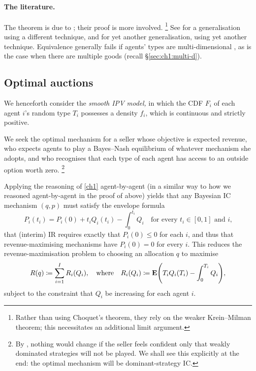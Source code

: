 \paragraph{The literature.}
The theorem is due to \textcite{ManelliVincent2010};
their proof is more involved.%
	\footnote{Rather than using Choquet's theorem, they rely on the weaker Krein--Milman theorem; this necessitates an additional limit argument.}
See \textcite{GershkovEtAl2013} for a generalisation using a different technique, and \textcite{KleinerMoldovanuStrack2021} for yet another generalisation, using yet another technique.
Equivalence generally fails if agents' types are multi-dimensional \parencite{JehielMoldovanuStacchetti1999}, as is the case when there are multiple goods (recall §\ref{sec:ch1:multi-d}).



\subsection{Optimal auctions}
\label{sec:ch2:optimal_auctions}

We henceforth consider the \emph{smooth IPV model,}
in which the CDF $F_i$ of each agent $i$'s random type $T_i$
possesses a density $f_i$, which is continuous and strictly positive.

We seek the optimal mechanism for a seller
whose objective is expected revenue,
who expects agents to play a Bayes--Nash equilibrium of whatever mechanism she adopts,
and who recognises that each type of each agent has access to an outside option worth zero.%
	\footnote{By , nothing would change if the seller feels confident only that weakly dominated strategies will not be played. We shall see this explicitly at the end: the optimal mechanism will be dominant-strategy IC.}

Applying the reasoning of \cref{ch1} agent-by-agent (in a similar way to how we reasoned agent-by-agent in the proof of  above)
yields that any Bayesian IC mechanism $(q,p)$ must satisfy the envelope formula
%
\begin{equation*}
	P_i(t_i) = P_i(0) + t_i Q_i(t_i) - \int_0^{t_i} Q_i
	\quad \text{for every $t_i \in [0,1]$ and $i$,}
\end{equation*}
%
that (interim) IR requires exactly that $P_i(0) \leq 0$ for each $i$,
and thus that revenue-maximising mechanisms have $P_i(0)=0$ for every $i$.
This reduces the revenue-maximisation problem to choosing an allocation $q$ to maximise
%
\begin{equation*}
	R(q) \coloneqq \sum_{i=1}^I R_i(Q_i) ,
	\quad \text{where} \quad
	R_i(Q_i)
	\coloneqq \E\left( T_i Q_i(T_i) - \int_0^{T_i} Q_i \right) ,
\end{equation*}
%
subject to the constraint that $Q_i$ be increasing for each agent $i$.

